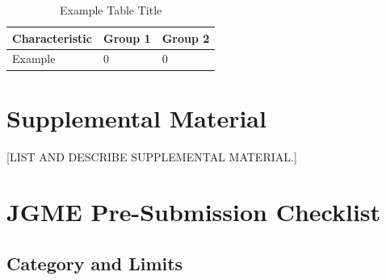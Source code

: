 \documentclass[12pt]{article}
\begin{document}

\begin{table}[ht]
	\centering
	\caption{Example Table Title}
	\begin{tabular}{lll}
		\toprule
		Characteristic & Group 1 & Group 2 \\
		\midrule
		Example        & 0       & 0       \\
		\bottomrule
	\end{tabular}
\end{table}

%


\clearpage
\section*{Supplemental Material}


 [LIST AND DESCRIBE SUPPLEMENTAL MATERIAL.]


\clearpage
\section*{JGME Pre-Submission Checklist}

\subsection*{Category and Limits}
\end{document}
